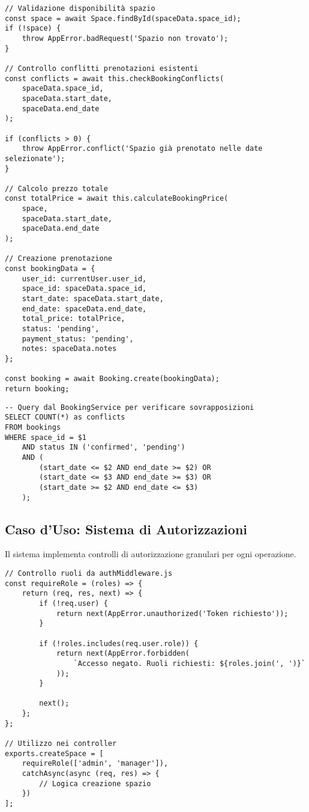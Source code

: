 \begin{lstlisting}[caption=Creazione Prenotazione con Validazioni (BookingService.js)]
// Validazione disponibilità spazio
const space = await Space.findById(spaceData.space_id);
if (!space) {
    throw AppError.badRequest('Spazio non trovato');
}

// Controllo conflitti prenotazioni esistenti
const conflicts = await this.checkBookingConflicts(
    spaceData.space_id, 
    spaceData.start_date, 
    spaceData.end_date
);

if (conflicts > 0) {
    throw AppError.conflict('Spazio già prenotato nelle date selezionate');
}

// Calcolo prezzo totale
const totalPrice = await this.calculateBookingPrice(
    space,
    spaceData.start_date,
    spaceData.end_date
);

// Creazione prenotazione
const bookingData = {
    user_id: currentUser.user_id,
    space_id: spaceData.space_id,
    start_date: spaceData.start_date,
    end_date: spaceData.end_date,
    total_price: totalPrice,
    status: 'pending',
    payment_status: 'pending',
    notes: spaceData.notes
};

const booking = await Booking.create(bookingData);
return booking;
\end{lstlisting}

\begin{lstlisting}[caption=Query Controllo Conflitti Prenotazioni]
-- Query dal BookingService per verificare sovrapposizioni
SELECT COUNT(*) as conflicts
FROM bookings
WHERE space_id = $1
    AND status IN ('confirmed', 'pending')
    AND (
        (start_date <= $2 AND end_date >= $2) OR
        (start_date <= $3 AND end_date >= $3) OR
        (start_date >= $2 AND end_date <= $3)
    );
\end{lstlisting}

\subsection{Caso d'Uso: Sistema di Autorizzazioni}

Il sistema implementa controlli di autorizzazione granulari per ogni operazione.

\begin{lstlisting}[caption=Middleware di Autorizzazione (authMiddleware.js)]
// Controllo ruoli da authMiddleware.js
const requireRole = (roles) => {
    return (req, res, next) => {
        if (!req.user) {
            return next(AppError.unauthorized('Token richiesto'));
        }

        if (!roles.includes(req.user.role)) {
            return next(AppError.forbidden(
                `Accesso negato. Ruoli richiesti: ${roles.join(', ')}`
            ));
        }

        next();
    };
};

// Utilizzo nei controller
exports.createSpace = [
    requireRole(['admin', 'manager']),
    catchAsync(async (req, res) => {
        // Logica creazione spazio
    })
];
\end{lstlisting}

